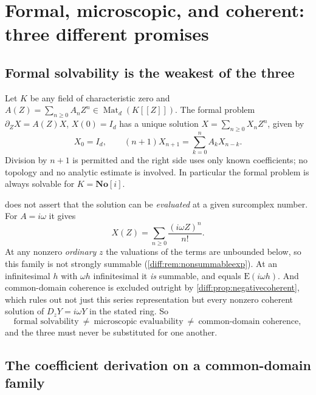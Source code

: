 \documentclass[11pt,letterpaper]{article}
\numberwithin{equation}{section}
\theoremstyle{definition}
\theoremstyle{remark}
\newcommand{\SC}{\mathbf{No}[i]}
\newcommand{\der}{\partial}
\newcommand{\Emm}{\mathrm{E}}
\newcommand{\derZ}{\der_{Z}}
\newcommand{\Dz}{D_{z}}
\newcommand{\Mat}{\operatorname{Mat}}
\begin{document}
\section{Formal, microscopic, and coherent: three different promises}
\label{diff:sec:formalexistence}

\subsection{Formal solvability is the weakest of the three}
\label{diff:sub:threepromises}

\begin{proposition}
\label{diff:prop:formalrecursion}
Let $K$ be any field of characteristic zero and
$A(Z)=\sum_{n\geq0}A_{n}Z^{n}\in\Mat_{d}(K[[Z]])$. The formal problem
$\derZ X=A(Z)X$, $X(0)=I_{d}$ has a unique solution
$X=\sum_{n\geq0}X_{n}Z^{n}$, given by
\begin{equation}\label{diff:eq:formalrecursion}
 X_{0}=I_{d},\qquad (n+1)X_{n+1}=\sum_{k=0}^{n}A_{k}X_{n-k}.
\end{equation}
Division by $n+1$ is permitted and the right side uses only known
coefficients; no topology and no analytic estimate is involved. In particular
the formal problem is always solvable for $K=\SC$.
\end{proposition}

\begin{warning}[Three promises, worked through $A=i\omega$]
\label{diff:warn:threepromises}
 does not assert that the solution can be
\emph{evaluated} at a given surcomplex number. For $A=i\omega$ it gives
\[
 X(Z)=\sum_{n\geq0}\frac{(i\omega Z)^{n}}{n!} .
\]
At any nonzero \emph{ordinary} $z$ the valuations of the terms are unbounded
below, so this family is not strongly summable
(\cref{diff:rem:nonsummableexp}). At an infinitesimal $h$ with $\omega h$
infinitesimal it \emph{is} summable, and equals $\Emm(i\omega h)$. And
common-domain coherence is excluded outright by
\cref{diff:prop:negativecoherent}, which rules out not just this series
representation but every nonzero coherent solution of $\Dz Y=i\omega Y$ in the
stated ring. So
\[
 \text{formal solvability}
 \ \neq\
 \text{microscopic evaluability}
 \ \neq\
 \text{common-domain coherence},
\]
and the three must never be substituted for one another.
\end{warning}

\subsection{The coefficient derivation on a common-domain family}
\label{diff:sub:coefderivation}
\end{document}
